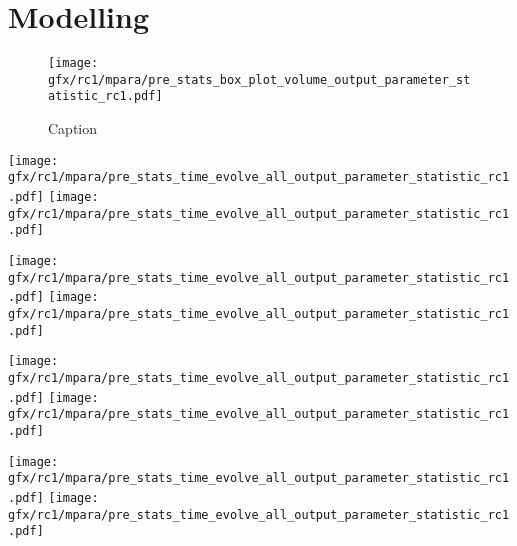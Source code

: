 \chapter{Modelling} %
\label{app:modelAnalysis}
%
%
% 
%
\begin{figure}[!h]
    \centering
    \texttt{[image: gfx/rc1/mpara/pre\_stats\_box\_plot\_volume\_output\_parameter\_statistic\_rc1.pdf]}
    \caption{Caption}
    \label{app:appModelVolumeBoxPlot}
\end{figure}
%
%
% 
%
%
\setlength{\tikzwidth}{\textwidth}
\begin{sidewaysfigure}[!h]
\centering
\texttt{[image: gfx/rc1/mpara/pre\_stats\_time\_evolve\_all\_output\_parameter\_statistic\_rc1.pdf]}
\texttt{[image: gfx/rc1/mpara/pre\_stats\_time\_evolve\_all\_output\_parameter\_statistic\_rc1.pdf]}
\label{app:pste1}
\end{sidewaysfigure}
%
\begin{sidewaysfigure}[!h]
\centering
\texttt{[image: gfx/rc1/mpara/pre\_stats\_time\_evolve\_all\_output\_parameter\_statistic\_rc1.pdf]}
\texttt{[image: gfx/rc1/mpara/pre\_stats\_time\_evolve\_all\_output\_parameter\_statistic\_rc1.pdf]}
\label{app:pste2}
\end{sidewaysfigure}
%
\begin{sidewaysfigure}[!h]
\centering
\texttt{[image: gfx/rc1/mpara/pre\_stats\_time\_evolve\_all\_output\_parameter\_statistic\_rc1.pdf]}
\texttt{[image: gfx/rc1/mpara/pre\_stats\_time\_evolve\_all\_output\_parameter\_statistic\_rc1.pdf]}
\label{app:pste3}
\end{sidewaysfigure}
%
\begin{sidewaysfigure}[!h]
\centering
\texttt{[image: gfx/rc1/mpara/pre\_stats\_time\_evolve\_all\_output\_parameter\_statistic\_rc1.pdf]}
\texttt{[image: gfx/rc1/mpara/pre\_stats\_time\_evolve\_all\_output\_parameter\_statistic\_rc1.pdf]}
\label{app:pste4}
\end{sidewaysfigure}
